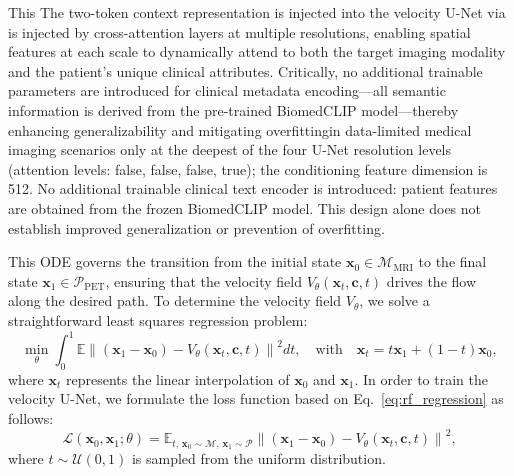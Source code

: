 \documentclass{article}
\providecommand{\DIFaddtex}[1]{{\protect\color{blue} \sf #1}} %
\providecommand{\DIFdeltex}[1]{{\protect\color{red} \scriptsize #1}} %
\providecommand{\DIFaddbegin}{} %
\providecommand{\DIFaddend}{} %
\providecommand{\DIFdelbegin}{} %
\providecommand{\DIFdelend}{} %
\providecommand{\DIFadd}[1]{\texorpdfstring{\DIFaddtex{#1}}{#1}} %
\providecommand{\DIFdel}[1]{\texorpdfstring{\DIFdeltex{#1}}{}} %
\newcommand{\DIFscaledelfig}{0.5}
\newlength{\DIFdelgraphicswidth} %
\newlength{\DIFdelgraphicsheight} %
\newcommand{\DIFaddincludegraphics}[2][]{{\color{blue}\fbox{\DIFOincludegraphics[#1]{#2}}}} %
\newcommand{\DIFdelincludegraphics}[2][]{%
\sbox{\DIFdelgraphicsbox}{\DIFOincludegraphics[#1]{#2}}%
\settoboxwidth{\DIFdelgraphicswidth}{\DIFdelgraphicsbox} %
\settoboxtotalheight{\DIFdelgraphicsheight}{\DIFdelgraphicsbox} %
\scalebox{\DIFscaledelfig}{%
\parbox[b]{\DIFdelgraphicswidth}{\usebox{\DIFdelgraphicsbox}\\[-\baselineskip] \rule{\DIFdelgraphicswidth}{0em}}\llap{\resizebox{\DIFdelgraphicswidth}{\DIFdelgraphicsheight}{%
\setlength{\unitlength}{\DIFdelgraphicswidth}%
\begin{picture}(1,1)%
\thicklines\linethickness{2pt} %
{\color[rgb]{1,0,0}\put(0,0){\framebox(1,1){}}}%
{\color[rgb]{1,0,0}\put(0,0){\line( 1,1){1}}}%
{\color[rgb]{1,0,0}\put(0,1){\line(1,-1){1}}}%
\end{picture}%
}\hspace*{3pt}}} %
} %
\DeclareRobustCommand{\DIFaddbegin}{\DIFOaddbegin \let\includegraphics\DIFaddincludegraphics} %
\DeclareRobustCommand{\DIFaddend}{\DIFOaddend \let\includegraphics\DIFOincludegraphics} %
\DeclareRobustCommand{\DIFdelbegin}{\DIFOdelbegin \let\includegraphics\DIFdelincludegraphics} %
\DeclareRobustCommand{\DIFdelend}{\DIFOaddend \let\includegraphics\DIFOincludegraphics} %
\begin{document}
\DIFdelbegin \DIFdel{This }\DIFdelend \DIFaddbegin \DIFadd{The }\DIFaddend two-token context \DIFdelbegin \DIFdel{representation is injected into the velocity U-Net via }\DIFdelend \DIFaddbegin \DIFadd{is injected by }\DIFaddend cross-attention \DIFdelbegin \DIFdel{layers at multiple resolutions, enabling spatial features at each scale to dynamically attend to both the target imaging modality and the patient’s unique clinical attributes. Critically, no additional trainable parameters are introduced for clinical metadata encoding—all semantic information is derived from the pre-trained BiomedCLIP model—thereby enhancing generalizability and mitigating overfittingin data-limited medical imaging scenarios}\DIFdelend \DIFaddbegin \DIFadd{only at the deepest of the four U-Net resolution levels (attention levels: false, false, false, true); the conditioning feature dimension is 512. No additional trainable clinical text encoder is introduced: patient features are obtained from the frozen BiomedCLIP model. This design alone does not establish improved generalization or prevention of overfitting}\DIFaddend .

This ODE governs the transition from the initial state $\mathbf{x}_0 \in \mathcal{M}_{\text{MRI}}$ to the final state $\mathbf{x}_1 \in \mathcal{P}_{\text{PET}}$, ensuring that the velocity field $V_\theta(\mathbf{x}_t, \mathbf{c}, t)$ drives the flow along the desired path. To determine the velocity field $V_\theta$, we solve a straightforward least squares regression problem:
\begin{equation}
\min_{\theta} \int_0^1 \mathbb{E} \left\| (\mathbf{x}_1 - \mathbf{x}_0) - V_\theta(\mathbf{x}_t, \mathbf{c}, t) \right\|^2 dt, \quad \text{with} \quad \mathbf{x}_t = t\mathbf{x}_1 + (1-t)\mathbf{x}_0,
\label{eq:rf_regression}
\end{equation}
where $\mathbf{x}_t$ represents the linear interpolation of $\mathbf{x}_0$ and $\mathbf{x}_1$. In order to train the velocity U-Net, we formulate the loss function based on Eq.~\eqref{eq:rf_regression} as follows:
\begin{equation}
\mathcal{L}(\mathbf{x}_0, \mathbf{x}_1; \theta) = \mathbb{E}_{t,\, \mathbf{x}_0 \sim \mathcal{M},\, \mathbf{x}_1 \sim \mathcal{P}} \left\| (\mathbf{x}_1 - \mathbf{x}_0) - V_\theta(\mathbf{x}_t, \mathbf{c}, t) \right\|^2,
\label{eq:rf_loss}
\end{equation}
where $t \sim \mathcal{U}(0, 1)$ is sampled from the uniform distribution.
\end{document}
